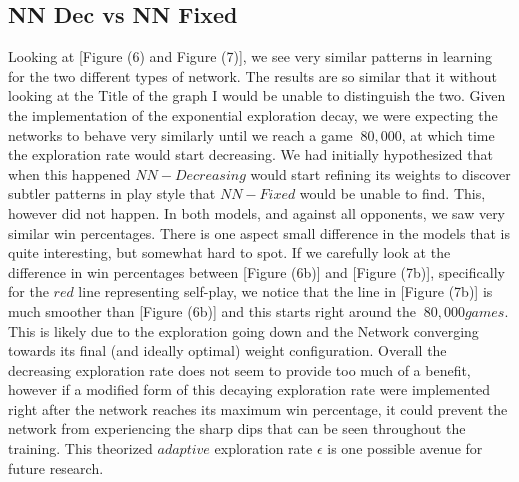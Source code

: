 \documentclass{sig-alternate-05-2015}
\begin{document}
\subsection{NN Dec vs NN Fixed}
	Looking at [Figure (6) and Figure (7)], we see very similar patterns in learning for the two different types of network. The results are so similar that it without looking at the Title of the graph I would be unable to distinguish the two. Given the implementation of the exponential exploration decay, we were expecting the networks to behave very similarly until we reach a game $~80,000$, at which time the exploration rate would start decreasing. We had initially hypothesized that when this happened $NN-Decreasing$ would start refining its weights to discover subtler patterns in play style that $NN-Fixed$ would be unable to find. This, however did not happen. In both models, and against all opponents, we saw very similar win percentages.
	There is one aspect small difference in the models that is quite interesting, but somewhat hard to spot. If we carefully look at the difference in win percentages between [Figure (6b)] and [Figure (7b)], specifically for the $red$ line representing self-play, we notice that the line in [Figure (7b)] is much smoother than [Figure (6b)] and this starts right around the $~80,000 games$. This is likely due to the exploration going down and the Network converging towards its final (and ideally optimal) weight configuration. Overall the decreasing exploration rate does not seem to provide too much of a benefit, however if a modified form of this decaying exploration rate were implemented right after the network reaches its maximum win percentage, it could prevent the network from experiencing the sharp dips that can be seen throughout the training. This theorized $adaptive$ exploration rate $\epsilon$ is one possible avenue for future research.
\end{document}
